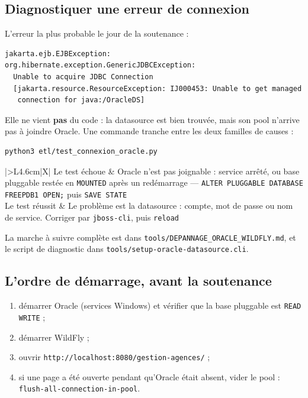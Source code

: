 \subsection{Diagnostiquer une erreur de connexion}

L'erreur la plus probable le jour de la soutenance :

\begin{lstlisting}[style=shell]
jakarta.ejb.EJBException: org.hibernate.exception.GenericJDBCException:
  Unable to acquire JDBC Connection
  [jakarta.resource.ResourceException: IJ000453: Unable to get managed
   connection for java:/OracleDS]
\end{lstlisting}

Elle ne vient \textbf{pas} du code : la datasource est bien trouvée, mais son
pool n'arrive pas à joindre Oracle. Une commande tranche entre les deux
familles de causes :

\begin{lstlisting}[style=shell]
python3 etl/test_connexion_oracle.py
\end{lstlisting}

\noindent\begin{tabularx}{\textwidth}{|>{\bfseries}L{4.6cm}|X|}
\hline
Le test échoue & Oracle n'est pas joignable : service arrêté, ou base pluggable restée en \texttt{MOUNTED} après un redémarrage --- \texttt{ALTER PLUGGABLE DATABASE FREEPDB1 OPEN;} puis \texttt{SAVE STATE}\\
\hline
Le test réussit & Le problème est la datasource : compte, mot de passe ou nom de service. Corriger par \texttt{jboss-cli}, puis \texttt{reload}\\
\hline
\end{tabularx}

\vspace{0.5em}
La marche à suivre complète est dans
\texttt{tools/DEPANNAGE\_ORACLE\_WILDFLY.md}, et le script de diagnostic dans
\texttt{tools/setup-oracle-datasource.cli}.

\subsection{L'ordre de démarrage, avant la soutenance}

\begin{enumerate}[leftmargin=*,itemsep=1pt]
  \item démarrer Oracle (services Windows) et vérifier que la base pluggable
        est \texttt{READ WRITE} ;
  \item démarrer WildFly ;
  \item ouvrir \texttt{http://localhost:8080/gestion-agences/} ;
  \item si une page a été ouverte pendant qu'Oracle était absent, vider le
        pool : \texttt{flush-all-connection-in-pool}.
\end{enumerate}
